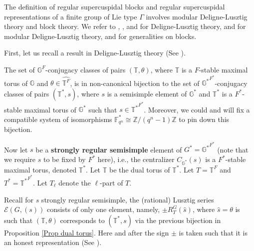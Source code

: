 		The definition of regular supercuspidal blocks and regular supercuspidal representations of a finite group of Lie type $\Gamma$ involves modular Deligne-Lusztig theory and block theory. We refer to \cite{deligne1976representations}, \cite{carter1985finite}, and \cite{digne2020representations} for Deligne-Lusztig theory, \cite{michel1989bloc} and \cite{broue1990isometries} for modular Deligne-Lusztig theory, and \cite[Appendix B]{bonnafe2010representations} for generalities on blocks. 
		
		First, let us recall a result in Deligne-Lusztig theory (See \cite[Proposition 11.1.5]{digne2020representations}). 
		
		\begin{proposition}\label{Prop dual torus}
			The set of $\mathbb{G}^F$-conjugacy classes of pairs $(\mathbb{T}, \theta)$, where  $\mathbb{T}$ is a $F$-stable maximal torus of  $\mathbb{G}$ and $\theta \in \widehat{\mathbb{T}^F}$, is in non-canonical bijection to the set of $\mathbb{G^*}^{F^*}$-conjugacy classes of pairs $(\mathbb{T}^*, s)$, where $s$ is a semisimple element of $\mathbb{G}^*$ and $\mathbb{T}^*$ is a $F^*$-stable maximal torus of $\mathbb{G}^*$ such that $s \in {\mathbb{T}^*}^{F^*}$.  Moreover, we could and will fix a compatible system of isomorphisms $\mathbb{F}_{q^n}^* \cong \mathbb{Z}/(q^n-1)\mathbb{Z}$ to pin down this bijection.
		\end{proposition}
		
		Now let $s$ be a \textbf{strongly regular semisimple} 
		element of $G^*={\mathbb{G}^*}^{F^*}$ (note that we require $s$ to be fixed by $F^*$ here), i.e., the centralizer $C_{\mathbb{G}^*}(s)$ is a $F^*$-stable maximal torus, denoted $\mathbb{T}^*$. Let $\mathbb{T}$ be the dual torus of $\mathbb{T}^*$. Let $T=\mathbb{T}^F$ and $T^*={\mathbb{T}^*}^{F^*}$. Let $T_\ell$ denote the $\ell$-part of $T$.
		
		Recall for $s$ strongly regular semisimple, the (rational) Lusztig series $\mathcal{E}(G, (s))$ consists of only one element, namely, $\pm R_T^G(\hat{s})$, where $\hat{s}=\theta$ is such that $(\mathbb{T}, \theta)$ corresponds to $(\mathbb{T}^*, s)$ via the previous bijection in Proposition \ref{Prop dual torus}. Here and after the sign $\pm$ is taken such that it is an honest representation (See \cite[Section 7.5]{carter1985finite}).
		
